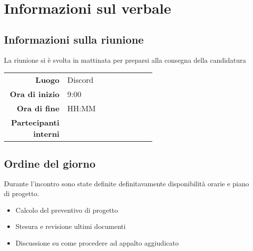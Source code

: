 \section{Informazioni sul verbale}

\subsection{Informazioni sulla riunione}
La riunione si è svolta in mattinata per preparsi alla consegna della candidatura

\begin{center}
	\begin{tabular}{r|p{0.6\linewidth}}
		\toprule
		\textbf{Luogo} & Discord \\
		\textbf{Ora di inizio} & 9:00 \\
		\textbf{Ora di fine} & HH:MM \\
		\textbf{Partecipanti interni} & \groupTeam
	\end{tabular}
\end{center}

\medskip

\subsection{Ordine del giorno}
Durante l'incontro sono state definite definitavamente disponibilità orarie e piano di progetto.
\begin{itemize}
	\item Calcolo del preventivo di progetto
	\item Stesura e revisione ultimi documenti
	\item Discussione su come procedere ad appalto aggiudicato
\end{itemize}
